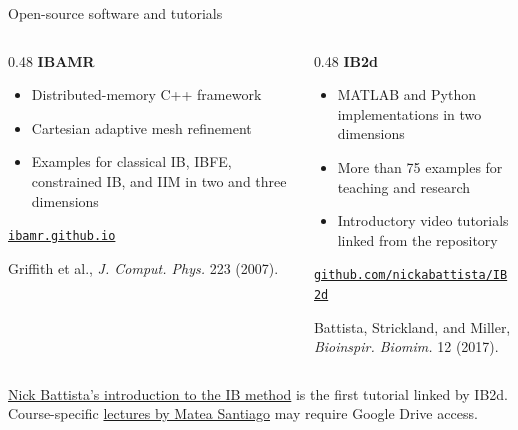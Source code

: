 \documentclass[aspectratio=169,11pt]{beamer}
\begin{document}
\begin{frame}{Open-source software and tutorials}
\begin{columns}[T,onlytextwidth]
\begin{column}{0.48\textwidth}
\textbf{IBAMR}
\begin{itemize}\itemsep4pt
  \item Distributed-memory C++ framework
  \item Cartesian adaptive mesh refinement
  \item Examples for classical IB, IBFE, constrained IB, and IIM in two and three dimensions
\end{itemize}
\href{https://ibamr.github.io/}{\texttt{ibamr.github.io}}

{\scriptsize Griffith et al., \emph{J. Comput. Phys.} 223 (2007).\par}
\end{column}
\begin{column}{0.48\textwidth}
\textbf{IB2d}
\begin{itemize}\itemsep4pt
  \item MATLAB and Python implementations in two dimensions
  \item More than 75 examples for teaching and research
  \item Introductory video tutorials linked from the repository
\end{itemize}
\href{https://github.com/nickabattista/IB2d}{\texttt{github.com/nickabattista/IB2d}}

{\scriptsize Battista, Strickland, and Miller, \emph{Bioinspir. Biomim.} 12 (2017).\par}
\end{column}
\end{columns}
\medskip
\begin{punchbox}
\small \href{https://www.youtube.com/watch?v=PJyQA0vwbgU}{Nick Battista's introduction to the IB method} is the first tutorial linked by IB2d. Course-specific \href{https://drive.google.com/drive/folders/1G2bkEsv2Jz_R7165a5BqPbW4dU2hXBHb?usp=sharing}{lectures by Matea Santiago} may require Google Drive access.
\end{punchbox}
\end{frame}
\end{document}
